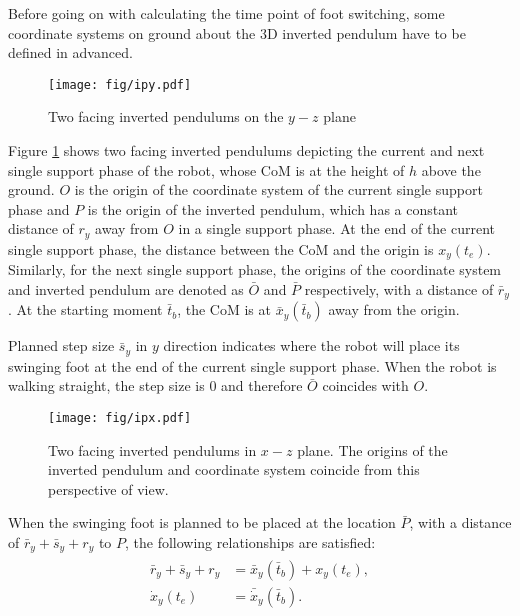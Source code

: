 Before going on with calculating the time point of foot switching, some coordinate systems on ground about the 3D inverted pendulum have to be defined in advanced.
\begin{figure}[H]
	\centering
	\texttt{[image: fig/ipy.pdf]}
	\caption{Two facing inverted pendulums on the $ y-z $ plane}
	\label{invertedpendulumy}
\end{figure}


Figure {\ref{invertedpendulumy}} shows two facing inverted pendulums depicting the current and next single support phase of the robot, whose CoM is at the height of $ h $ above the ground. $ O $ is the origin of the coordinate system of the current single support phase and $ P $ is the origin of the inverted pendulum, which has a constant distance of $ r_y $ away from $ O $ in a single support phase. At the end of the current single support phase, the distance between the CoM and  the origin is $ x_y(t_e) $. Similarly, for the next single support phase, the origins of the coordinate system and inverted pendulum are denoted as $ \bar{O} $ and $ \bar{P} $ respectively, with a distance of $ \bar{r}_y $. At the starting moment $ \bar{t}_b $, the CoM is at $ \bar{x}_y(\bar{t}_b) $ away from the origin.

Planned step size $ \bar{s}_y $ in $ y $ direction indicates where the robot will place its swinging foot at the end of the current single support phase. When the robot is walking straight, the step size is $ 0 $ and therefore $ \bar{O} $ coincides with $ O $.

\begin{figure}[H]
	\centering
	\texttt{[image: fig/ipx.pdf]}
	\caption[Two facing inverted pendulums on $ x-z $ plane]{Two facing inverted pendulums in $ x-z $ plane. The origins of the inverted pendulum and coordinate system coincide from this perspective of view.}
	\label{invertedpendulumx}
\end{figure}

When the swinging foot is planned to be placed at the location $ \bar{P} $, with a distance of $ \bar{r}_y+\bar{s}_y+r_y $ to $ P $, the following relationships are satisfied:
\begin{align}
\label{facingpendulumy}
\begin{split}
\bar{r}_y+\bar{s}_y+r_y &= \bar{x}_y(\bar{t}_b)+x_y(t_e),\\
\dot{x}_y(t_e)&=\bar{\dot{x}}_y(\bar{t}_b).
\end{split}
\end{align} 

